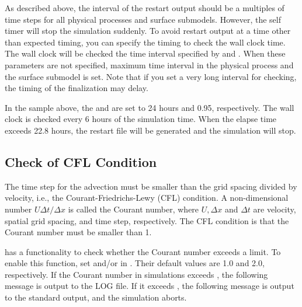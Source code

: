 As described above, the interval of the restart output should be a multiples of time steps for all physical processes and surface submodels. However, the self timer will stop the simulation suddenly.
To avoid restart output at a time other than expected timing, you can specify the timing to check the wall clock time.
The wall clock will be checked the time interval specified by  and . When these parameters are not specified, maximum time interval in the physical process and the surface submodel is set.
Note that if you set a very long interval for checking, the timing of the finalization may delay.

 In the sample above, the  and  are set to 24 hours and 0.95, respectively.
The wall clock is checked every 6 hours of the simulation time. When the elapse time exceeds 22.8 hours, the restart file will be generated and the simulation will stop.



\subsection{Check of CFL Condition} \label{subsec:cfl_check}

The time step for the advection  must be smaller than the grid spacing divided by velocity, i.e., the Courant-Friedrichs-Lewy (CFL) condition.
A non-dimensional number $U \Delta t/\Delta x$ is called the Courant number, where $U, \Delta x$ and $\Delta t$ are velocity, spatial grid spacing, and time step, respectively.
The CFL condition is that the Courant number must be smaller than 1.

\scalerm has a functionality to check whether the Courant number exceeds a limit.
To enable this function, set  and/or  in .
Their default values are 1.0 and 2.0, respectively.
If the Courant number in simulations exceeds , the following message is output to the LOG file.
If it exceeds , the following message is output to the standard output, and the simulation aborts.

